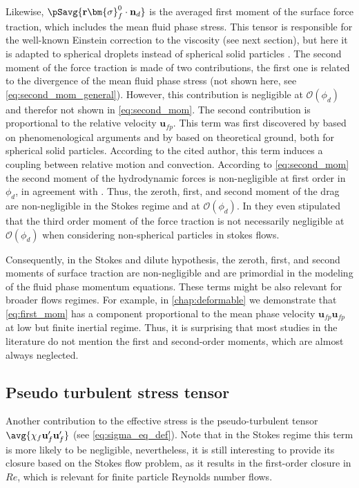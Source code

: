Likewise, $\pSavg{\textbf{r}\bm{\sigma}_f^0 \cdot \textbf{n}_d}$ is the averaged first moment of the surface force traction, which includes the mean fluid phase stress. 
This tensor is responsible for the well-known Einstein correction to the viscosity (see next section), but here it is adapted to spherical droplets instead of spherical solid particles \citep{rallison1978note}. 
The second moment of the force traction is made of two contributions, the first one is related to the divergence of the mean fluid phase stress (not shown here, see \ref{eq:second_mom_general}). 
However, this contribution is negligible at $\mathcal{O}(\phi_d)$ \citep{jackson1997locally} and therefor not shown in \ref{eq:second_mom}.  
The second contribution is proportional to the relative velocity $\textbf{u}_{fp}$.
This term was first discovered by \citet{nozieres1987local} based on phenomenological arguments and by \citet{lhuillier1992volume} based on theoretical ground, both for spherical solid particles. 
According to the cited author, this term induces a coupling between relative motion and convection. 
According to \ref{eq:second_mom} the second moment of the hydrodynamic forces is non-negligible at first order in $\phi_d$, in agreement with \citep{jackson1997locally,zhang1997momentum}. 
Thus, the zeroth, first, and second moment of the drag are non-negligible in the Stokes regime and at $\mathcal{O}(\phi_d)$. 
In \citet{zhang1997momentum} they even stipulated that the third order moment of the force traction is not necessarily negligible at $\mathcal{O}(\phi_d)$ when considering non-spherical particles in stokes flows. 

Consequently, in the Stokes and dilute hypothesis, the zeroth, first, and second moments of surface traction are non-negligible and are primordial in the modeling of the fluid phase momentum equations. 
These terms might be also relevant for broader flows regimes. 
For example, in \ref{chap:deformable} we demonstrate that \ref{eq:first_mom} has a component proportional to the mean phase velocity $\textbf{u}_{fp}\textbf{u}_{fp}$ at low but finite inertial regime. 
Thus, it is surprising that most studies in the literature do not mention the first and second-order moments, which are almost always neglected. 

\subsection{Pseudo turbulent stress tensor}

Another contribution to the effective stress is the pseudo-turbulent tensor $\avg{\chi_f \textbf{u}_f'\textbf{u}_f'}$ (see \ref{eq:sigma_eq_def}). 
Note that in the Stokes regime this term is more likely to be negligible, nevertheless, it is still interesting to provide its closure based on the Stokes flow problem, as it results in the first-order closure in $Re$, which is relevant for finite particle Reynolds number flows.

